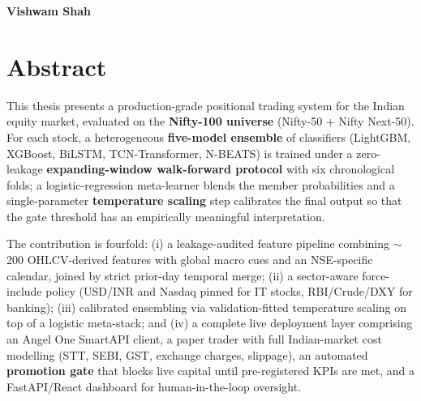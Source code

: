     \begin{flushright}
    \textbf{Vishwam Shah}\\
    \end{flushright}

    \chapter*{Abstract}
    \pagestyle{fancy}
    This thesis presents a production-grade positional trading system for the Indian equity market, evaluated on the \textbf{Nifty-100 universe} (Nifty-50 + Nifty Next-50). For each stock, a heterogeneous \textbf{five-model ensemble} of classifiers (LightGBM, XGBoost, BiLSTM, TCN-Transformer, N-BEATS) is trained under a zero-leakage \textbf{expanding-window walk-forward protocol} with six chronological folds; a logistic-regression meta-learner blends the member probabilities and a single-parameter \textbf{temperature scaling} step calibrates the final output so that the gate threshold has an empirically meaningful interpretation.

    The contribution is fourfold: (i) a leakage-audited feature pipeline combining \(\sim\)200 OHLCV-derived features with global macro cues and an NSE-specific calendar, joined by strict prior-day temporal merge; (ii) a sector-aware force-include policy (USD/INR and Nasdaq pinned for IT stocks, RBI/Crude/DXY for banking); (iii) calibrated ensembling via validation-fitted temperature scaling on top of a logistic meta-stack; and (iv) a complete live deployment layer comprising an Angel One SmartAPI client, a paper trader with full Indian-market cost modelling (STT, SEBI, GST, exchange charges, slippage), an automated \textbf{promotion gate} that blocks live capital until pre-registered KPIs are met, and a FastAPI/React dashboard for human-in-the-loop oversight.

